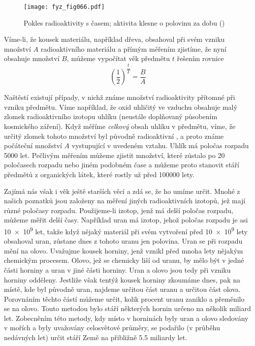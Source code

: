     \begin{figure}[ht!]  %
      \centering
      \texttt{[image: fyz\_fig066.pdf]}
      \caption{Pokles radioaktivity s časem; aktivita klesne o polovinu za dobu  (\cite[s.~68]{Feynman01})}
      \label{fyz:fig066}
    \end{figure}    
    Víme-li, že kousek materiálu, například dřeva, obsahoval při svém vzniku množství \(A\) 
    radioaktivního materiálu a přímým měřením zjistíme, že nyní obsahuje množství \(B\), můžeme 
    vypočítat věk předmětu \(t\) řešením rovnice
    \begin{equation}\label{FYZ:eq065}
      \left(\dfrac{1}{2}\right)^{\dfrac{t}{T}} = \dfrac{B}{A}
    \end{equation}
    
    Naštěstí existují případy, v nichž známe množství radioaktivity přítomné při vzniku předmětu. 
    Víme například, že oxid uhličitý ve vzduchu obsahuje malý zlomek radioaktivního izotopu uhlíku 
     (neustále doplňovaný působením kosmického záření). Když měříme \emph{celkový} obsah 
    uhlíku v předmětu, víme, že určitý zlomek tohoto množství byl původně radioaktivní , 
    a proto známe počáteční množství \(A\) vystupující v uvedeném vztahu. Uhlík  má 
    poločas rozpadu \num{5000} let. Pečlivým měřením můžeme zjistit množství, které zůstalo po 
    \num{20} poločasech rozpadu nebo jiném podobném čase a můžeme proto stanovit stáří předmětů z 
    organických látek, které rostly už před \num{100000} lety.
    
    Zajímá nás však i věk ještě starších věcí a zdá se, že ho umíme určit. Mnohé z našich poznatků 
    jsou založeny na měření jiných radioaktivních izotopů, jež mají různé poločasy rozpadu. 
    Použijeme-li izotop, jenž má delší poločas rozpadu, můžeme měřit delší časy. Například uran má 
    izotop, jehož poločas rozpadu je asi \num{10e9} let, takže když nějaký materiál při svém 
    vytvoření před \num{10e9} lety obsahoval uran, zůstane dnes z tohoto uranu jen polovina. Uran 
    se při rozpadu mění na olovo. Uvažujme kousek horniny, jenž vznikl před mnoha lety nějakým 
    chemickým procesem. Olovo, jež se chemicky liší od uranu, by mělo být v jedné části horniny a 
    uran v jiné části horniny. Uran a olovo jsou tedy při vzniku horniny odděleny. Jestliže však 
    tentýž kousek horniny zkoumáme dnes, pak na místě, kde byl původně uran, najdeme určitou část 
    uranu a určitou část olova. Porovnáním těchto částí můžeme určit, kolik procent uranu zaniklo a 
    přeměnilo se na olovo. Touto metodou bylo stáří některých hornin určeno na několik miliard let. 
    Zobecněním této metody, kdy místo v horninách byly uran a olovo sledovány v mořích a byly 
    uvažovány celosvětové průměry, se podařilo (v průběhu nedávných let) určit stáří Země na 
    přibližně \num{5.5} miliardy let.
    
